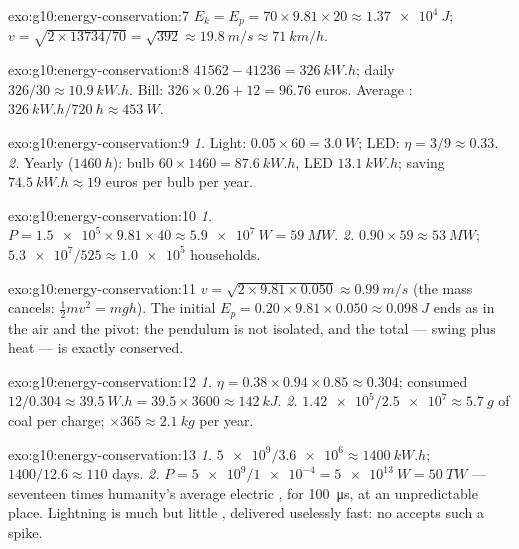 \begin{solution}{exo:g10:energy-conservation:7}
$E_k = E_p = 70 \times 9.81 \times 20 \approx \qty{1.37e4}{J}$;
$v = \sqrt{2 \times 13734/70} = \sqrt{392} \approx \qty{19.8}{m/s}
\approx \qty{71}{km/h}$.
\end{solution}

\begin{solution}{exo:g10:energy-conservation:8}
$41562 - 41236 = \qty{326}{kW.h}$; daily $326/30 \approx
\qty{10.9}{kW.h}$. Bill: $326 \times 0.26 + 12 = 96.76$ euros.
Average : $\qty{326}{kW.h}/\qty{720}{h} \approx \qty{453}{W}$.
\end{solution}

\begin{solution}{exo:g10:energy-conservation:9}
\emph{1.} Light: $0.05 \times 60 = \qty{3.0}{W}$; LED:
$\eta = 3/9 \approx 0.33$.
\emph{2.} Yearly ($\qty{1460}{h}$): bulb
$60 \times 1460 = \qty{87.6}{kW.h}$, LED $\qty{13.1}{kW.h}$;
saving $\qty{74.5}{kW.h} \approx 19$ euros per bulb per year.
\end{solution}

\begin{solution}{exo:g10:energy-conservation:10}
\emph{1.} $P = \num{1.5e5} \times 9.81 \times 40 \approx
\qty{5.9e7}{W} = \qty{59}{MW}$.
\emph{2.} $0.90 \times 59 \approx \qty{53}{MW}$;
$\num{5.3e7}/525 \approx \num{1.0e5}$ households.
\end{solution}

\begin{solution}{exo:g10:energy-conservation:11}
$v = \sqrt{2 \times 9.81 \times 0.050} \approx \qty{0.99}{m/s}$
(the mass cancels: $\tfrac12 m v^2 = mgh$). The initial
$E_p = 0.20 \times 9.81 \times 0.050 \approx \qty{0.098}{J}$ ends
as  in the air and the pivot: the pendulum is not
isolated, and the total --- swing plus heat --- is exactly
conserved.
\end{solution}

\begin{solution}{exo:g10:energy-conservation:12}
\emph{1.} $\eta = 0.38 \times 0.94 \times 0.85 \approx 0.304$;
consumed $12/0.304 \approx \qty{39.5}{W.h}
= 39.5 \times 3600 \approx \qty{142}{kJ}$.
\emph{2.} $\num{1.42e5}/\num{2.5e7} \approx \qty{5.7}{g}$ of coal
per charge; $\times 365 \approx \qty{2.1}{kg}$ per year.
\end{solution}

\begin{solution}{exo:g10:energy-conservation:13}
\emph{1.} $\num{5e9}/\num{3.6e6} \approx \qty{1400}{kW.h}$;
$1400/12.6 \approx 110$ days.
\emph{2.} $P = \num{5e9}/\num{1e-4} = \qty{5e13}{W} = \qty{50}{TW}$
--- seventeen times humanity's average electric , for
\qty{100}{\micro s}, at an unpredictable place. Lightning is much
 but little , delivered uselessly fast: no 
accepts such a spike.
\end{solution}

